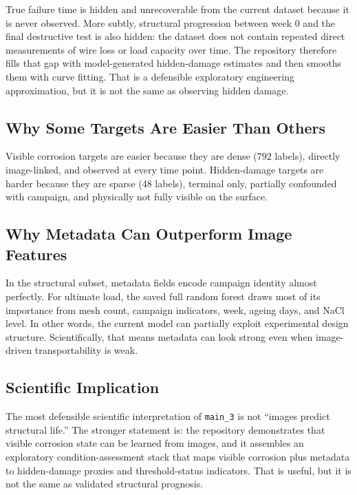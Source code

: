 \documentclass[11pt,a4paper]{article}
\begin{document}
True failure time is hidden and unrecoverable from the current dataset because it is never observed. More subtly, structural progression between week 0 and the final destructive test is also hidden: the dataset does not contain repeated direct measurements of wire loss or load capacity over time. The repository therefore fills that gap with model-generated hidden-damage estimates and then smooths them with curve fitting. That is a defensible exploratory engineering approximation, but it is not the same as observing hidden damage.

\subsection{Why Some Targets Are Easier Than Others}

Visible corrosion targets are easier because they are dense (792 labels), directly image-linked, and observed at every time point. Hidden-damage targets are harder because they are sparse (48 labels), terminal only, partially confounded with campaign, and physically not fully visible on the surface.

\subsection{Why Metadata Can Outperform Image Features}

In the structural subset, metadata fields encode campaign identity almost perfectly. For ultimate load, the saved full random forest draws most of its importance from mesh count, campaign indicators, week, ageing days, and NaCl level. In other words, the current model can partially exploit experimental design structure. Scientifically, that means metadata can look strong even when image-driven transportability is weak.

\subsection{Scientific Implication}

The most defensible scientific interpretation of \texttt{main\_3} is not ``images predict structural life.'' The stronger statement is: the repository demonstrates that visible corrosion state can be learned from images, and it assembles an exploratory condition-assessment stack that maps visible corrosion plus metadata to hidden-damage proxies and threshold-status indicators. That is useful, but it is not the same as validated structural prognosis.
\end{document}
